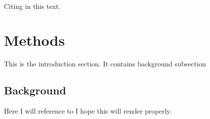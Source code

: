 \documentclass[11pt,a4paper,oneside,openright,titlepage,
  headinclude,footinclude,BCOR5mm,
  numbers=noenddot,cleardoublepage=empty,
  tablecaptionabove, dottedtoc,
  bibliography=totoc]{scrreprt}
\begin{document}
Citing \citet{rimal2019pred} in this text.

\hypertarget{methods}{%
\chapter{Methods}\label{methods}}

This is the introduction section. It contains background subsection

\hypertarget{background}{%
\section{Background}\label{background}}

Here I will reference to \citep{naes2013multi} I hope this will render properly.

  



\nocite{*}

\appendix
\end{document}
